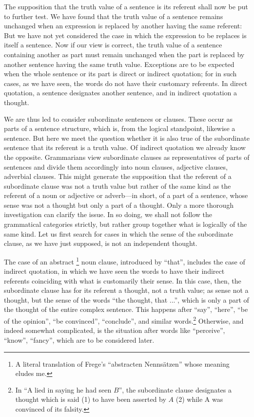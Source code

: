 \documentclass[twoside,12pt]{article}
\newcommand{\footnoteAlph}[2][\thefootnote]{%
  \renewcommand{\thefootnote}{\Alph{footnote}}%
  \footnote[#1]{#2}%
  \renewcommand{\thefootnote}{\arabic{footnote}}}
\begin{document}
The supposition that the truth value of a sentence is its referent
shall now be put to further test. We have found that the truth value
of a sentence remains unchanged when an expression is replaced by
another having the same referent: But we have not yet considered the
case in which the expression to be replaces is itself a sentence. Now
if our view is correct, the truth value of a sentence containing
another as part must remain unchanged when the part is replaced by
another sentence having the same truth value. Exceptions are to be
expected when the whole sentence or its part is direct or indirect
quotation; for in such cases, as we have seen, the words do not have
their customary referents. In direct quotation, a sentence designates
another sentence, and in indirect quotation a thought.

We are thus led to consider subordinate sentences or clauses. These
occur as parts of a sentence structure, which is, from the logical
standpoint, likewise a sentence. But here we meet the question whether
it is also true of the subordinate sentence that its referent is a
truth value. Of indirect quotation we already know the opposite.
Grammarians view subordinate clauses as representatives of parts of
sentences and divide them accordingly into noun clauses, adjective
clauses, adverbial clauses. This might generate the supposition that
the referent of a subordinate clause was not a truth value but rather
of the same kind as the referent of a noun or adjective or adverb---in
short, of a part of a sentence, whose sense was not a thought but only
a part of a thought. Only a more thorough investigation can clarify
the issue. In so doing, we shall not follow the grammatical categories
strictly, but rather group together what is logically of the same
kind. Let us first search for cases in which the sense of the
subordinate clause, as we have just supposed, is not an independent
thought.

The case of an abstract\footnoteAlph[4]{A literal translation of
  Frege's ``abstracten Nenns\"atzen'' whose meaning eludes me.} noun
clause, introduced by ``that'', includes the case of indirect
quotation, in which we have seen the words to have their indirect
referents coinciding with what is customarily their sense. In this
case, then, the subordinate clause has for its referent a thought, not
a truth value; as sense not a thought, but the sense of the words
``the thought, that ...'', which is only a part of the thought of the
entire complex sentence. This happens after ``say'', ``here'', ``be of
the opinion'', ``be convinced'', ``conclude'', and similar
words.\footnote[8]{In ``A lied in saying he had seen $B$'', the
  subordinate clause designates a thought which is said (1) to have
  been asserted by $A$ (2) while A was convinced of its falsity.}
Otherwise, and indeed somewhat complicated, is the situation after
words like ``perceive'', ``know'', ``fancy'', which are to be
considered later.
\end{document}
